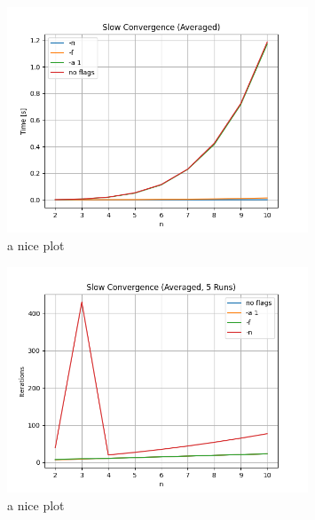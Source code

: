 \begin{figure}[ht]
	\centering
	\includegraphics[width=0.8\textwidth]{./Problems/slow_convergence/plots/time_small.png}
	\caption{a nice plot}
	\label{fig:slow:time_small}
\end{figure}

\begin{figure}[ht]
	\centering
	\includegraphics[width=0.8\textwidth]{./Problems/slow_convergence/plots/iterations_small.png}
	\caption{a nice plot}
	\label{fig:slow:iterations_small}
\end{figure}
